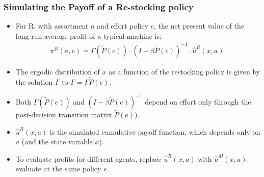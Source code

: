 
\begin{frame}[label=supplemental2]
\frametitle{Simulating the Payoff of a Re-stocking policy}
\vfill
\begin{itemize}
\item For R, with assortment $a$ and effort policy $e$, the net present value of the long-run average profit of a typical machine is: 
\begin{eqnarray}
\label{retail_payoffs}
\pi^R(a,e) = \Gamma(\tilde{P}(e)) \cdot(I - \beta \tilde{P}(e))^{-1} \cdot \hat{u}^R(x,a).
\end{eqnarray}
\item The ergodic distribution of $x$ as a function of the restocking policy is given by the solution $\Gamma$ to $\Gamma= \Gamma \tilde{P}(e). $ 
\item  Both $\Gamma(\tilde{P}(e))$ and $(I - \beta \tilde{P}(e))^{-1}$ depend on effort only through the post-decision transition matrix $\tilde{P}(e)$). 
\item $\hat{u}^R(x,a)$ is the simulated cumulative payoff function, which depends only on $a$ (and the state variable $x$). 
\item To evaluate profits for different agents, replace $\hat{u}^R(x,a)$ with $\hat{u}^M(x,a)$; evaluate at the same policy $e$.
\end{itemize}
\vfill
\hyperlink{main}{}
\end{frame}


